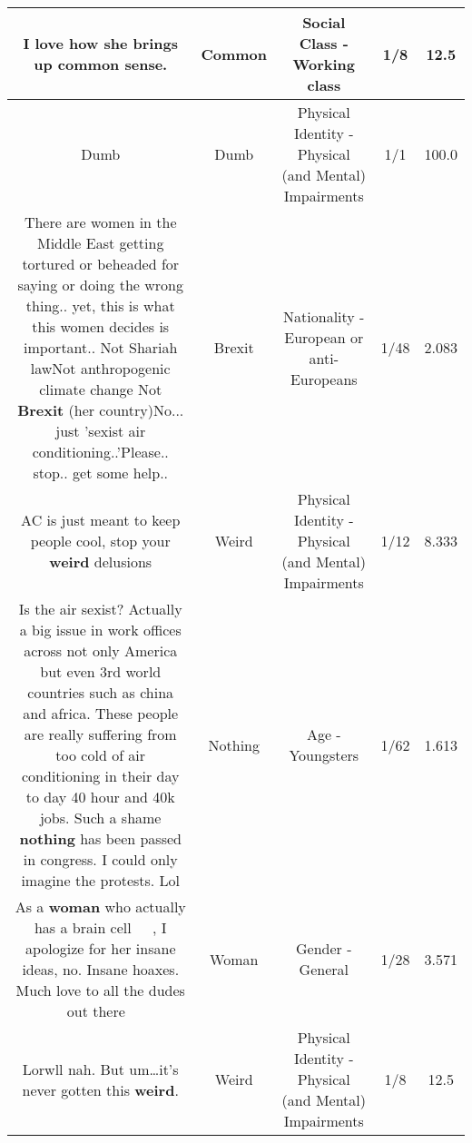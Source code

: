 \documentclass[11pt]{article}
\newlength\mylength
\begin{document}
\begin{center}
\begin{longtable}{|C{.65\mylength}|C{.30\mylength}|C{.12\mylength}|C{.12\mylength}|C{.12\mylength}|}
  \small I love how she brings up \textbf{common} sense.\normalsize   & Common & Social Class - Working class & 1/8 & 12.5 \\  \hline
  \small Dumb\normalsize   & Dumb & Physical Identity - Physical (and Mental) Impairments & 1/1 & 100.0 \\  \hline
  \small There are women in the Middle East getting tortured or beheaded for saying or doing the wrong thing.. yet, this is what this women decides is important..   Not Shariah lawNot anthropogenic climate change Not \textbf{Brexit} (her country)No... just 'sexist air conditioning..'Please.. stop.. get some help..\normalsize   & Brexit & Nationality - European or anti-Europeans & 1/48 & 2.083 \\  \hline
  \small AC is just meant to keep people cool, stop your \textbf{weird} delusions\normalsize   & Weird & Physical Identity - Physical (and Mental) Impairments & 1/12 & 8.333 \\  \hline
  \small Is the air sexist? Actually a big issue in work offices across not only America but even 3rd world countries such as china and africa. These people are really suffering from too cold of air conditioning in their day to day 40 hour and 40k jobs. Such a shame \textbf{nothing} has been passed in congress. I could only imagine the protests. Lol\normalsize   & Nothing & Age - Youngsters & 1/62 & 1.613 \\  \hline
  \small As a \textbf{woman} who actually has a brain cell 🧠👩🏻‍🦰, I apologize for her insane ideas, no. Insane hoaxes. Much love to all the dudes out there 💯\normalsize   & Woman & Gender - General & 1/28 & 3.571 \\  \hline
  \small Lorwll nah. But um…it's never gotten this \textbf{weird}.\normalsize   & Weird & Physical Identity - Physical (and Mental) Impairments & 1/8 & 12.5 \\  \hline

\end{longtable}
\end{center}
\end{document}
